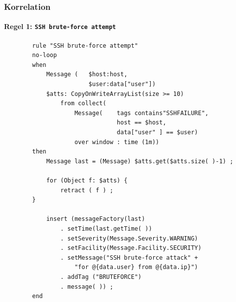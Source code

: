 \begin{frame}[fragile]
\frametitle{Korrelation}
\framesubtitle{Regel 1: \texttt{SSH brute-force attempt}}

\begin{center}
    \begin{minipage}{0.7\textwidth}
        \begin{verbatim}
        rule "SSH brute-force attempt"
        no-loop
        when
            Message (   $host:host,
                        $user:data["user"])
            $atts: CopyOnWriteArrayList(size >= 10)
                from collect(
                    Message(    tags contains"SSHFAILURE",
                                host == $host,
                                data["user" ] == $user)
                    over window : time (1m))
        then
            Message last = (Message) $atts.get($atts.size( )-1) ;
        
            for (Object f: $atts) {
                retract ( f ) ;
        }
        
            insert (messageFactory(last)
                . setTime(last.getTime( ))
                . setSeverity(Message.Severity.WARNING)
                . setFacility(Message.Facility.SECURITY)
                . setMessage("SSH brute-force attack" +
                    "for @{data.user} from @{data.ip}")
                . addTag ("BRUTEFORCE")
                . message( )) ;
        end        
        
        \end{verbatim}
    \end{minipage}
\end{center}

\end{frame}

